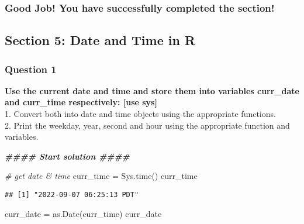 \documentclass[
]{article}
\newenvironment{Shaded}{\begin{snugshade}}{\end{snugshade}}
\newcommand{\CommentTok}[1]{\textcolor[rgb]{0.56,0.35,0.01}{\textit{#1}}}
\newcommand{\DocumentationTok}[1]{\textcolor[rgb]{0.56,0.35,0.01}{\textbf{\textit{#1}}}}
\newcommand{\FunctionTok}[1]{\textcolor[rgb]{0.00,0.00,0.00}{#1}}
\newcommand{\NormalTok}[1]{#1}
\newcommand{\OtherTok}[1]{\textcolor[rgb]{0.56,0.35,0.01}{#1}}
\begin{document}
\hypertarget{good-job-you-have-successfully-completed-the-section-3}{%
\subsubsection{Good Job! You have successfully completed the
section!}\label{good-job-you-have-successfully-completed-the-section-3}}

\hypertarget{section-5-date-and-time-in-r}{%
\subsection{Section 5: Date and Time in
R}\label{section-5-date-and-time-in-r}}

\hypertarget{question-1-4}{%
\subsubsection{Question 1}\label{question-1-4}}

\textbf{Use the current date and time and store them into variables
curr\_date and curr\_time respectively: {[}use sys{]}}\\
1. Convert both into date and time objects using the appropriate
functions.\\
2. Print the weekday, year, second and hour using the appropriate
function and variables.

\begin{Shaded}
\begin{Highlighting}[]
\DocumentationTok{\#\#\#\# Start solution \#\#\#\#}
\end{Highlighting}
\end{Shaded}

\begin{Shaded}
\begin{Highlighting}[]
\CommentTok{\# get date \& time}
\NormalTok{curr\_time }\OtherTok{=} \FunctionTok{Sys.time}\NormalTok{()}
\NormalTok{curr\_time}
\end{Highlighting}
\end{Shaded}

\begin{verbatim}
## [1] "2022-09-07 06:25:13 PDT"
\end{verbatim}

\begin{Shaded}
\begin{Highlighting}[]
\NormalTok{curr\_date }\OtherTok{=} \FunctionTok{as.Date}\NormalTok{(curr\_time)}
\NormalTok{curr\_date }
\end{Highlighting}
\end{Shaded}
\end{document}
